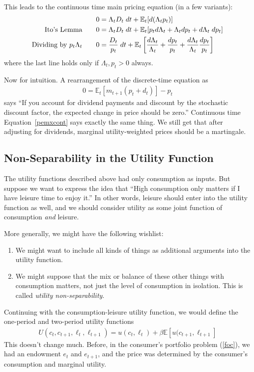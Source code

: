 \documentclass[a4paper,12pt]{scrartcl}
\begin{document}
This leads to the continuous time main pricing equation (in a few
variants):
\begin{align}
  0 &= \Lambda_t D_t \; dt + \mathbb{E}_t[d(\Lambda_t p_t)]
  \label{pemxcont}\\
  \text{Ito's Lemma}\qquad
  0 &= \Lambda_t D_t \; dt
  + \mathbb{E}_t[p_t d\Lambda_t + \Lambda_t dp_t + d\Lambda_t\; dp_t]
  \notag\\
  \text{Dividing by $p_t\Lambda_t$}\qquad
  0 &= \frac{D_t}{p_t} \; dt
  + \mathbb{E}_t\left[\frac{d\Lambda_t}{\Lambda_t}
  + \frac{dp_t}{p_t} + \frac{d\Lambda_t}{\Lambda_t}\frac{dp_t}{p_t}
  \right]
  \notag
\end{align}
where the last line holds only if $\Lambda_t,p_t>0$ always.

Now for intuition. A rearrangement of the discrete-time equation as
\begin{align*}
  0=\mathbb{E}_t[m_{t+1}(p_t+d_t)]-p_t
\end{align*}
says ``If you account for dividend payments and discount by the
stochastic discount factor, the expected change in price should be
zero.'' Continuous time Equation~\ref{pemxcont} says exactly the same
thing.  We still get that after adjusting for dividends, marginal
utility-weighted prices should be a martingale.


\subsection{Non-Separability in the Utility Function}

The utility functions described above had only consumption as inputs.
But suppose we want to express the idea that ``High consumption only
matters if I have leisure time to enjoy it.'' In other words, leisure
should enter into the utility function as well, and we should consider
utility as some joint function of consumption \emph{and} leisure.

More generally, we might have the following wishlist:
\begin{enumerate}
  \item We might want to include all kinds of things as additional
    arguments into the utility function.
  \item We might suppose that the mix or balance of these other things
    with consumption matters, not just the level of consumption in
    isolation. This is called \emph{utility non-separability}.
\end{enumerate}
Continuing with the consumption-leisure utility function, we would
define the one-period and two-period utility functions
\begin{align*}
  U(c_t,c_{t+1},\ell_t,\ell_{t+1})
  =
  u(c_t,\ell_t) + \beta \mathbb{E}[u(c_{t+1},\ell_{t+1}]
\end{align*}
This doesn't change much. Before, in the consumer's portfolio problem
(\ref{foc}), we had an endowment $e_t$ and $e_{t+1}$, and the price was
determined by the consumer's consumption and marginal utility.
\end{document}
